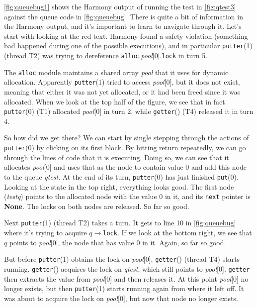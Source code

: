 \documentclass{report}
\begin{document}
\autoref{fig:queuebug1} shows the Harmony output of running
the test in \autoref{fig:qtest3} against the queue code
in \autoref{fig:queuebug}.
There is quite a bit of information in the Harmony output, and it's
important to learn to navigate through it.
Let's start with looking at the red text.  Harmony found a safety
violation (something bad happened during one of the possible executions),
and in particular \texttt{putter}(1) (thread T2) was trying to dereference
\texttt{alloc}.\textit{pool}[0].\texttt{lock} in turn 5.

The \texttt{alloc} module maintains a shared array \textit{pool} that
it uses for dynamic allocation.  Apparently \texttt{putter}(1) tried to access
\textit{pool}[0], but it does not exist, meaning that either it was not
yet allocated, or it had been freed since it was allocated.
When we look at the top half of the figure, we see that in fact
\texttt{putter}(0) (T1) allocated \textit{pool}[0] in turn 2, while
\texttt{getter}() (T4) released it in turn 4.

So how did we get there?  We can start by single stepping through the
actions of \texttt{putter}(0) by clicking on its first block.
By hitting return repeatedly, we can go through the lines of code that
it is executing.  Doing so, we can see that it allocates
\textit{pool}[0] and uses that as the node to contain value 0 and add
this node to the queue \textit{qtest}.  At the end of its turn,
\texttt{putter}(0) has just finished \texttt{put}(0).  Looking at the
state in the top right, everything looks good.  The first node
(\textit{testq}) points to the allocated node with the value 0 in it,
and its \texttt{next} pointer is \textbf{None}.  The locks on both nodes
are released.  So far so good.

Next \texttt{putter}(1) (thread T2) takes a turn.  It gets to line 10 in
\autoref{fig:queuebug} where it's trying to acquire
$q$$\rightarrow$\texttt{lock}.  If we look at the bottom right,
we see that $q$ points to \textit{pool}[0], the node that has value 0
in it.  Again, so far so good.

But before \texttt{putter}(1) obtains
the lock on \textit{pool}[0], \texttt{getter}() (thread T4) starts
running.  \texttt{getter}() acquires the lock on \textit{qtest}, which
still points to \textit{pool}[0].  \texttt{getter} then extracts the
value from \textit{pool}[0] and then releases it.
At this point \textit{pool}[0] no longer exists, but then
\texttt{putter}(1) starts running again from where it left off.
It was about to acquire the lock on \textit{pool}[0], but now that
node no longer exists.
\end{document}

